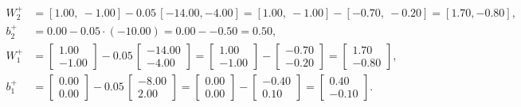 \documentclass[11pt]{article}
\begin{document}
\begin{align*}
W_2^+&=[1.00,\ -1.00]-0.05\,[-14.00, -4.00]=[1.00,\ -1.00]-[-0.70,\ -0.20]=[1.70, -0.80],\\
b_2^+&=0.00-0.05\cdot(-10.00)=0.00--0.50=0.50,\\
W_1^+&=\begin{bmatrix}1.00\\-1.00\end{bmatrix}-0.05\,\begin{bmatrix}-14.00\\-4.00\end{bmatrix}=\begin{bmatrix}1.00\\-1.00\end{bmatrix}-\begin{bmatrix}-0.70\\-0.20\end{bmatrix}=\begin{bmatrix}1.70\\-0.80\end{bmatrix},\\
b_1^+&=\begin{bmatrix}0.00\\0.00\end{bmatrix}-0.05\,\begin{bmatrix}-8.00\\2.00\end{bmatrix}=\begin{bmatrix}0.00\\0.00\end{bmatrix}-\begin{bmatrix}-0.40\\0.10\end{bmatrix}=\begin{bmatrix}0.40\\-0.10\end{bmatrix}.
\end{align*}
\end{document}

